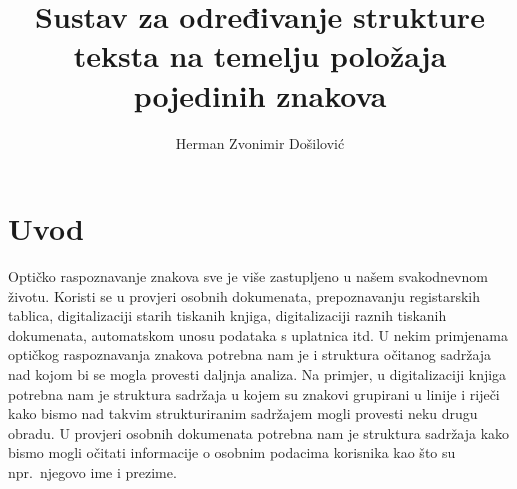 \documentclass[times, utf8, zavrsni]{fer}
\begin{document}


\title{
    Sustav za određivanje strukture teksta na temelju položaja pojedinih znakova
}

\author{Herman Zvonimir Došilović}

\maketitle




\tableofcontents
















\chapter{Uvod}
Optičko raspoznavanje znakova sve je više zastupljeno u našem svakodnevnom
životu. Koristi se u provjeri osobnih dokumenata, prepoznavanju registarskih
tablica, digitalizaciji starih tiskanih knjiga, digitalizaciji raznih tiskanih
dokumenata, automatskom unosu podataka s uplatnica itd. U nekim primjenama
optičkog raspoznavanja znakova potrebna nam je i struktura očitanog sadržaja
nad kojom bi se mogla provesti daljnja analiza. Na primjer, u digitalizaciji
knjiga potrebna nam je struktura sadržaja u kojem su znakovi grupirani u linije
i riječi kako bismo nad takvim strukturiranim sadržajem mogli provesti neku
drugu obradu. U provjeri osobnih dokumenata potrebna nam je struktura sadržaja
kako bismo mogli očitati informacije o osobnim podacima korisnika kao što su
npr.\ njegovo ime i prezime.
\end{document}
